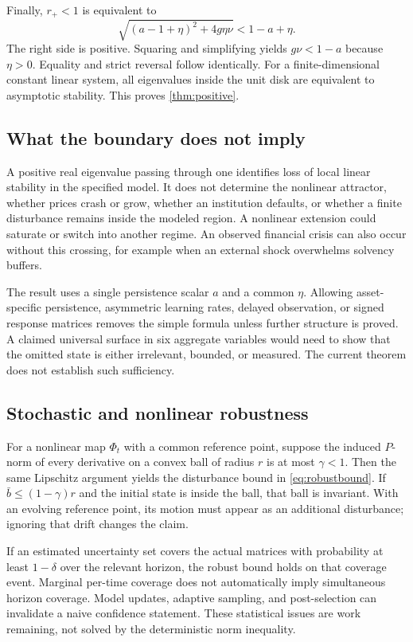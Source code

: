 \documentclass[11pt,a4paper]{article}
\theoremstyle{definition}
\theoremstyle{remark}
\begin{document}
Finally, $r_+<1$ is equivalent to
\begin{equation}
 \sqrt{(a-1+\eta)^2+4g\eta\nu}<1-a+\eta.
\end{equation}
The right side is positive. Squaring and simplifying yields $g\nu<1-a$ because $\eta>0$. Equality and strict reversal follow identically. For a finite-dimensional constant linear system, all eigenvalues inside the unit disk are equivalent to asymptotic stability. This proves \cref{thm:positive}.

\subsection{What the boundary does not imply}
A positive real eigenvalue passing through one identifies loss of local linear stability in the specified model. It does not determine the nonlinear attractor, whether prices crash or grow, whether an institution defaults, or whether a finite disturbance remains inside the modeled region. A nonlinear extension could saturate or switch into another regime. An observed financial crisis can also occur without this crossing, for example when an external shock overwhelms solvency buffers.

The result uses a single persistence scalar $a$ and a common $\eta$. Allowing asset-specific persistence, asymmetric learning rates, delayed observation, or signed response matrices removes the simple formula unless further structure is proved. A claimed universal surface in six aggregate variables would need to show that the omitted state is either irrelevant, bounded, or measured. The current theorem does not establish such sufficiency.

\subsection{Stochastic and nonlinear robustness}
For a nonlinear map $\Phi_t$ with a common reference point, suppose the induced $P$-norm of every derivative on a convex ball of radius $r$ is at most $\gamma<1$. Then the same Lipschitz argument yields the disturbance bound in \cref{eq:robustbound}. If $\bar b\leq(1-\gamma)r$ and the initial state is inside the ball, that ball is invariant. With an evolving reference point, its motion must appear as an additional disturbance; ignoring that drift changes the claim.

If an estimated uncertainty set covers the actual matrices with probability at least $1-\delta$ over the relevant horizon, the robust bound holds on that coverage event. Marginal per-time coverage does not automatically imply simultaneous horizon coverage. Model updates, adaptive sampling, and post-selection can invalidate a naive confidence statement. These statistical issues are work remaining, not solved by the deterministic norm inequality.
\end{document}
